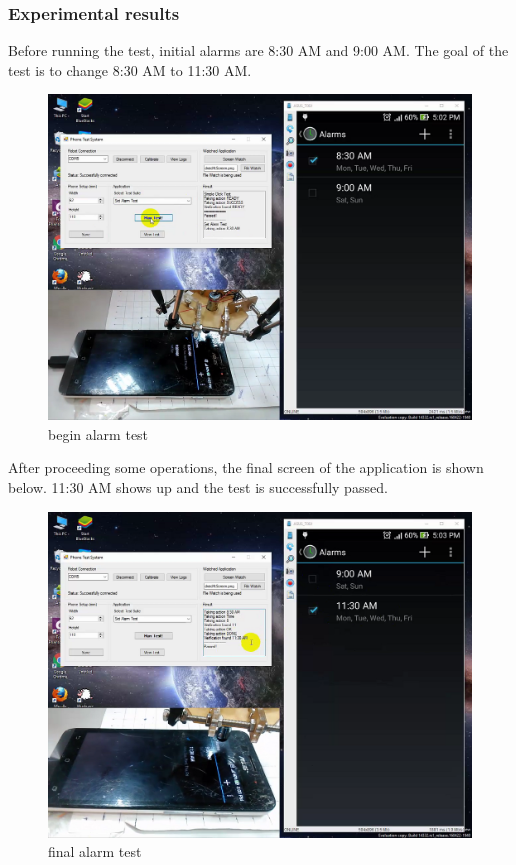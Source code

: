 \subsubsection{Experimental results}
Before running the test, initial alarms are 8:30 AM and 9:00 AM. The goal of the test is to change 8:30 AM to 11:30 AM.

	\begin{figure}[H]
		\centering
		\includegraphics[scale=0.5]{Chapters/Fig/alarm_start.png}
		\caption{begin alarm test}
		\label{fig:alarm_start}
	\end{figure}

After proceeding some operations, the final screen of the application is shown below. 11:30 AM shows up and the test is successfully passed.

	\begin{figure}[H]
		\centering
		\includegraphics[scale=0.5]{Chapters/Fig/alarm_final.png}
		\caption{final alarm test}
		\label{fig:alarm_final}
	\end{figure}

